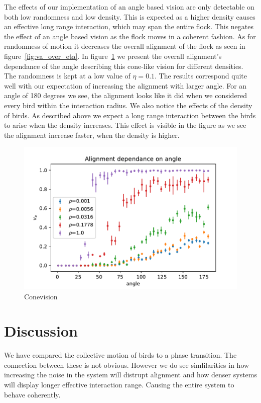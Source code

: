 \documentclass[twoside,twocolumn]{article}
\begin{document}
The effects of our implementation of an angle based vision are only detectable on both low randomness and low density.
This is expected as a higher density causes an effective long range interaction, which may span the entire flock.
This negates the effect of an angle based vision as the flock moves in a coherent fashion.
As for randomness of motion it decreases the overall alignment of the flock as seen in figure~\ref{fig:va_over_eta}.
In figure~\ref{fig:conevision} we present the overall alignment's dependance of the angle describing this cone-like
vision for different densities. The randomness is kept at a low value of $\eta=0.1$.
The results correspond quite well with our expectation of increasing the alignment with larger angle.
For an angle of 180 degrees we see, the alignment looks like it did when we considered every bird within the interaction radius.
We also notice the effects of the density of birds. As described above we expect a long range interaction
between the birds to arise when the density increases.
This effect is visible in the figure as we see the alignment increase faster, when the density is higher.

\begin{figure}[!htb]
\begin{center}
\includegraphics[width=\columnwidth]{va_over_angle}
\end{center}
\caption{Conevision}\label{fig:conevision}
\end{figure}

\section{Discussion}

We have compared the collective motion of birds to a phase transition.
The connection between these is not obvious. However we do see simlilarities in how increasing the noise in the system
will distrupt alignment and how denser systems will display longer effective interaction range. Causing the entire
system to behave coherently.
\end{document}
